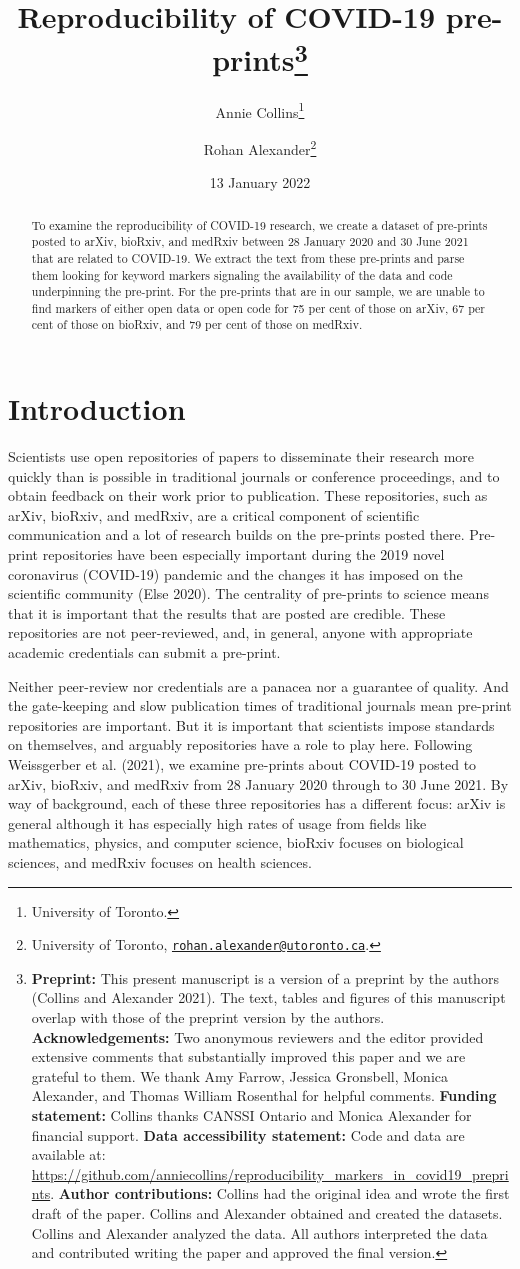 \documentclass[
]{article}
\title{Reproducibility of COVID-19 pre-prints\thanks{\textbf{Preprint:} This present manuscript is a version of a preprint by the authors (Collins and Alexander 2021). The text, tables and figures of this manuscript overlap with those of the preprint version by the authors. \textbf{Acknowledgements:} Two anonymous reviewers and the editor provided extensive comments that substantially improved this paper and we are grateful to them. We thank Amy Farrow, Jessica Gronsbell, Monica Alexander, and Thomas William Rosenthal for helpful comments. \textbf{Funding statement:} Collins thanks CANSSI Ontario and Monica Alexander for financial support. \textbf{Data accessibility statement:} Code and data are available at: \url{https://github.com/anniecollins/reproducibility_markers_in_covid19_preprints}. \textbf{Author contributions:} Collins had the original idea and wrote the first draft of the paper. Collins and Alexander obtained and created the datasets. Collins and Alexander analyzed the data. All authors interpreted the data and contributed writing the paper and approved the final version.}}
\author{Annie Collins\footnote{University of Toronto.} \and Rohan Alexander\footnote{University of Toronto, \href{mailto:rohan.alexander@utoronto.ca}{\nolinkurl{rohan.alexander@utoronto.ca}}.}}
\date{13 January 2022}
\begin{document}
\maketitle
\begin{abstract}
To examine the reproducibility of COVID-19 research, we create a dataset of pre-prints posted to arXiv, bioRxiv, and medRxiv between 28 January 2020 and 30 June 2021 that are related to COVID-19. We extract the text from these pre-prints and parse them looking for keyword markers signaling the availability of the data and code underpinning the pre-print. For the pre-prints that are in our sample, we are unable to find markers of either open data or open code for 75 per cent of those on arXiv, 67 per cent of those on bioRxiv, and 79 per cent of those on medRxiv.
\end{abstract}

\hypertarget{introduction}{%
\section{Introduction}\label{introduction}}

Scientists use open repositories of papers to disseminate their research more quickly than is possible in traditional journals or conference proceedings, and to obtain feedback on their work prior to publication. These repositories, such as arXiv, bioRxiv, and medRxiv, are a critical component of scientific communication and a lot of research builds on the pre-prints posted there. Pre-print repositories have been especially important during the 2019 novel coronavirus (COVID-19) pandemic and the changes it has imposed on the scientific community (Else 2020). The centrality of pre-prints to science means that it is important that the results that are posted are credible. These repositories are not peer-reviewed, and, in general, anyone with appropriate academic credentials can submit a pre-print.

Neither peer-review nor credentials are a panacea nor a guarantee of quality. And the gate-keeping and slow publication times of traditional journals mean pre-print repositories are important. But it is important that scientists impose standards on themselves, and arguably repositories have a role to play here. Following Weissgerber et al. (2021), we examine pre-prints about COVID-19 posted to arXiv, bioRxiv, and medRxiv from 28 January 2020 through to 30 June 2021. By way of background, each of these three repositories has a different focus: arXiv is general although it has especially high rates of usage from fields like mathematics, physics, and computer science, bioRxiv focuses on biological sciences, and medRxiv focuses on health sciences.
\end{document}
